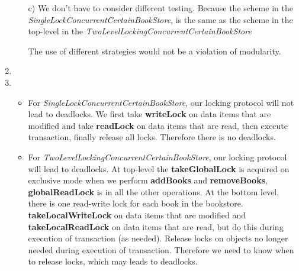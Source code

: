 \documentclass[11pt]{article}
\begin{document}
\begin{enumerate}
\begin{itemize}
		\item[c)]
		We don't have to consider different testing. Because the scheme in the \textit{SingleLockConcurrentCertainBookStore},  is the same as the scheme in the top-level in the \textit{TwoLevelLockingConcurrentCertainBookStore}
		
		The use of different strategies would not be a violation of modularity.
		\end{itemize}
	\item
	\item
		\begin{itemize}
		 \item
		 For \textit{SingleLockConcurrentCertainBookStore}, our locking protocol will not lead to 
		 deadlocks. We first take \textbf{writeLock} on data items that are modified and take 
		 \textbf{readLock} on data items that are read, then execute transaction, finally release all 
		 locks. Therefore there is no deadlocks.
		 
		 \item
		 For \textit{TwoLevelLockingConcurrentCertainBookStore}, our locking protocol will lead to 
		 deadlocks. At top-level the \textbf{takeGlobalLock} is acquired on exclusive mode when we 
		 perform \textbf{addBooks} and \textbf{removeBooks}, \textbf{globalReadLock} is in all the 
		 other operations. At the bottom level, there is one read-write lock for each book in the 
		 bookstore.
		 \textbf{takeLocalWriteLock} on data items that are modified and \textbf{takeLocalReadLock} on 
		 data items that are read, but do this during execution of transaction (as needed). Release locks 
		 on objects no longer needed during execution of transaction. Therefore we need to know when to 
		 release locks, which may leads to deadlocks.
	
		\end{itemize}
	
\end{enumerate}
\end{document}

